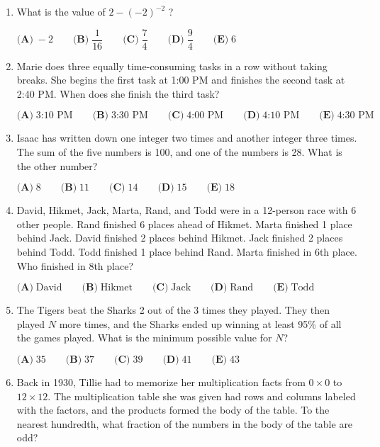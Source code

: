 \documentclass{article}
\begin{document}
\begin{enumerate}[label=\arabic*., itemsep=0.5em]
\item What is the value of \(2-(-2)^{-2}\) ?

\(\textbf{(A)}\; -2 \qquad\textbf{(B)}\; \dfrac{1}{16} \qquad\textbf{(C)}\; \dfrac{7}{4} \qquad\textbf{(D)}\; \dfrac{9}{4} \qquad\textbf{(E)}\; 6\)\par \vspace{0.5em}\item Marie does three equally time-consuming tasks in a row without taking breaks. She begins the first task at 1:00 PM and finishes the second task at 2:40 PM. When does she finish the third task?

\(\textbf{(A)}\; \text{3:10 PM} \qquad\textbf{(B)}\; \text{3:30 PM} \qquad\textbf{(C)}\; \text{4:00 PM} \qquad\textbf{(D)}\; \text{4:10 PM} \qquad\textbf{(E)}\; \text{4:30 PM}\)\par \vspace{0.5em}\item Isaac has written down one integer two times and another integer three times. The sum of the five numbers is 100, and one of the numbers is 28. What is the other number?

\(\textbf{(A)}\; 8 \qquad\textbf{(B)}\; 11 \qquad\textbf{(C)}\; 14 \qquad\textbf{(D)}\; 15 \qquad\textbf{(E)}\; 18\)\par \vspace{0.5em}\item David, Hikmet, Jack, Marta, Rand, and Todd were in a 12-person race with 6 other people. Rand finished 6 places ahead of Hikmet. Marta finished 1 place behind Jack. David finished 2 places behind Hikmet. Jack finished 2 places behind Todd. Todd finished 1 place behind Rand. Marta finished in 6th place. Who finished in 8th place?

\(\textbf{(A)}\; \text{David} \qquad\textbf{(B)}\; \text{Hikmet} \qquad\textbf{(C)}\; \text{Jack} \qquad\textbf{(D)}\; \text{Rand} \qquad\textbf{(E)}\; \text{Todd}\)\par \vspace{0.5em}\item The Tigers beat the Sharks 2 out of the 3 times they played. They then played \(N\) more times, and the Sharks ended up winning at least 95\% of all the games played. What is the minimum possible value for \(N\)?

\(\textbf{(A)}\; 35 \qquad  \textbf{(B)}\; 37 \qquad \textbf{(C)}\; 39 \qquad \textbf{(D)}\; 41 \qquad \textbf{(E)}\; 43\)\par \vspace{0.5em}\item Back in 1930, Tillie had to memorize her multiplication facts from \(0 \times 0\) to \(12 \times 12\). The multiplication table she was given had rows and columns labeled with the factors, and the products formed the body of the table. To the nearest hundredth, what fraction of the numbers in the body of the table are odd?


\end{enumerate}
\end{document}
